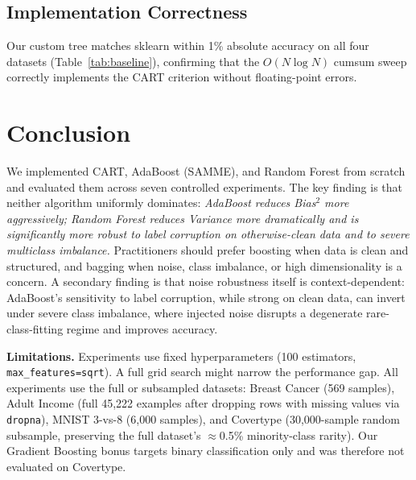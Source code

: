 \documentclass[conference]{IEEEtran}
\begin{document}
\subsection{Implementation Correctness}
Our custom tree matches sklearn within 1\% absolute accuracy on all
four datasets (Table~\ref{tab:baseline}), confirming that the $O(N\log N)$
cumsum sweep correctly implements the CART criterion without
floating-point errors.

\section{Conclusion}
\label{sec:conclusion}

We implemented CART, AdaBoost (SAMME), and Random Forest from scratch
and evaluated them across seven controlled experiments.  The key
finding is that neither algorithm uniformly dominates: \emph{AdaBoost
reduces Bias$^2$ more aggressively; Random Forest reduces Variance
more dramatically and is significantly more robust to label corruption
on otherwise-clean data and to severe multiclass imbalance.}
Practitioners should prefer boosting when data is clean and structured,
and bagging when noise, class imbalance, or high dimensionality is a
concern.  A secondary finding is that noise robustness itself is
context-dependent: AdaBoost's sensitivity to label corruption, while
strong on clean data, can invert under severe class imbalance, where
injected noise disrupts a degenerate rare-class-fitting regime and
improves accuracy.

\textbf{Limitations.}  Experiments use fixed hyperparameters
(100 estimators, \texttt{max\_features=sqrt}).  A full grid search
might narrow the performance gap.  All experiments use the full or subsampled
datasets: Breast Cancer (569 samples), Adult Income (full 45,222
examples after dropping rows with missing values via \texttt{dropna}), MNIST
3-vs-8 (6,000 samples), and Covertype (30,000-sample random subsample,
preserving the full dataset's $\approx$0.5\% minority-class rarity).
Our Gradient Boosting bonus targets binary classification only and
was therefore not evaluated on Covertype.
\end{document}
